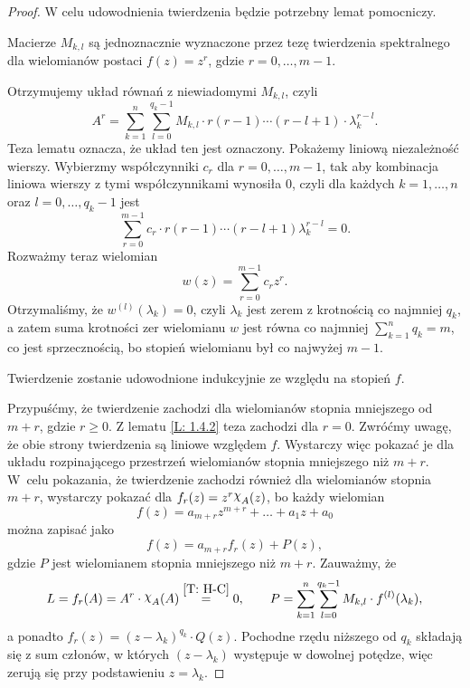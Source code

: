\begin{proof}
  W celu udowodnienia twierdzenia będzie potrzebny lemat pomocniczy.
%
  \begin{nestedlemma} \label{L: 1.4.2}
    Macierze $M_{k,l}$ są jednoznacznie wyznaczone przez tezę twierdzenia spektralnego dla
    wielomianów postaci $f(z) = z^r$, gdzie $r = 0, \ldots, m-1$.
  \end{nestedlemma}
%
  \begin{nestedproof}
    Otrzymujemy układ równań z niewiadomymi $M_{k,l}$, czyli
%   
    \begin{equation*}
      A^r = \sum_{k=1}^n \sum_{l=0}^{q_k-1} M_{k,l} \cdot r (r-1) \cdots (r-l+1) \cdot \lambda_k^{r-l}.
    \end{equation*}
%   
    Teza lematu oznacza, że układ ten jest oznaczony. Pokażemy liniową niezależność wierszy. Wybierzmy współczynniki 
    $c_r$ dla $r = 0, \ldots, m-1$, tak aby kombinacja liniowa wierszy z tymi współczynnikami wynosiła $0$, czyli dla
    każdych $k = 1,\ldots,n$ oraz $l = 0, \ldots, q_k-1$ jest
%   
    \begin{equation*}
      \sum_{r=0}^{m-1} c_r \cdot r (r-1) \cdots (r-l+1) \lambda_k^{r-l} = 0.
    \end{equation*}
%
    Rozważmy teraz wielomian
%    
    \begin{equation*}
      w(z) = \sum_{r=0}^{m-1} c_r z^r.
    \end{equation*}
%
    Otrzymaliśmy, że $w^{(l)}(\lambda_k) = 0$, czyli 
    $\lambda_k$ jest zerem z krotnością co najmniej $q_k$, a zatem suma krotności zer wielomianu $w$ jest równa co 
    najmniej $\sum_{k=1}^n q_k = m$, co jest sprzecznością, bo stopień wielomianu był co najwyżej $m-1$.
  \end{nestedproof}
%
  Twierdzenie zostanie udowodnione indukcyjnie ze względu na stopień $f$.
  
  Przypuśćmy, że twierdzenie zachodzi dla wielomianów stopnia mniejszego od $m+r$, gdzie $r \geq 0$. Z lematu 
  \ref{L: 1.4.2} teza zachodzi dla $r=0$. Zwróćmy uwagę, że obie strony twierdzenia są liniowe względem $f$. 
  Wystarczy więc pokazać je dla układu rozpinającego przestrzeń wielomianów stopnia mniejszego niż $m+r$. W~celu 
  pokazania, że twierdzenie zachodzi również dla wielomianów stopnia $m+r$, wystarczy pokazać dla $f_r(z) = z^r 
  \mychi_A(z)$, bo każdy wielomian
%
  \begin{equation*}
    f(z) = a_{m+r} z^{m+r} + \ldots + a_1 z + a_0
  \end{equation*}
%
  można zapisać jako
%
  \begin{equation*}
    f(z) = a_{m+r} f_r(z) + P(z),
  \end{equation*}
%
  gdzie $P$ jest wielomianem stopnia mniejszego niż $m+r$. Zauważmy, że
%
  \begin{equation*}
    L = f_r(A) = A^r \cdot \mychi_A(A) \overset{\ref{T: H-C}}{=} 0, \qquad 
    P = \sum_{k=1}^n \sum_{l=0}^{q_k-1} M_{k,l} \cdot f^{(l)}(\lambda_k),
  \end{equation*}
%
  a ponadto $f_r(z) = (z-\lambda_k)^{q_k} \cdot Q(z)$. Pochodne rzędu niższego od $q_k$ składają się z sum członów, w 
  których $(z-\lambda_k)$ występuje w dowolnej potędze, więc zerują się przy podstawieniu $z=\lambda_k$.
%
\end{proof}
